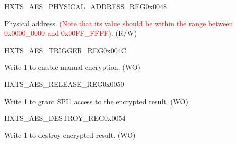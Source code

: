\begin{register}{H}{XTS\_AES\_PHYSICAL\_ADDRESS\_REG}{0x0048}\label{regdesc:XTSAESPHYSICALADDRESSREG}
%
%
\regnewline%
\begin{regdesc}\begin{reglist}
\item [XTS\_AES\_PHYSICAL\_ADDRESS] Physical address.  \textcolor{red}{(Note that its value should be within the range between 0x0000\_0000 and 0x00FF\_FFFF).} (R/W)
\end{reglist}\end{regdesc}
\end{register}

\begin{register}{H}{XTS\_AES\_TRIGGER\_REG}{0x004C}\label{regdesc:XTSAESTRIGGERREG}
%
%
\regnewline%
\begin{regdesc}\begin{reglist}
\item [XTS\_AES\_TRIGGER] Write 1 to enable manual encryption. (WO)
\end{reglist}\end{regdesc}
\end{register}

\begin{register}{H}{XTS\_AES\_RELEASE\_REG}{0x0050}\label{regdesc:XTSAESRELEASEREG}
%
%
\regnewline%
\begin{regdesc}\begin{reglist}
\item [XTS\_AES\_RELEASE] Write 1 to grant SPI1 access to the encrypted result. (WO)
\end{reglist}\end{regdesc}
\end{register}

\begin{register}{H}{XTS\_AES\_DESTROY\_REG}{0x0054}\label{regdesc:XTSAESDESTROYREG}
%
%
\regnewline%
\begin{regdesc}\begin{reglist}
\item [XTS\_AES\_DESTROY] Write 1 to destroy encrypted result. (WO)
\end{reglist}\end{regdesc}
\end{register}


